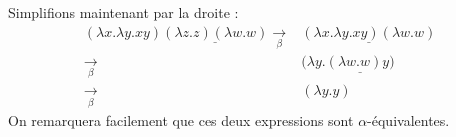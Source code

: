 \documentclass{article}
\begin{document}
\noindent Simplifions maintenant par la droite : 
\begin{align*}
    (\lambda x. \lambda y. x y) \underline{(\lambda z.z) (\lambda w.w)} \xrightarrow[\beta]{} & \underline{(\lambda x. \lambda y. x y) (\lambda w.w)} \\
    \xrightarrow[\beta]{} & (\lambda y.\underline{(\lambda w.w) y)} \\
    \xrightarrow[\beta]{} & (\lambda y.y)
\end{align*}
On remarquera facilement que ces deux expressions sont $\alpha$-équivalentes.
\end{document}
